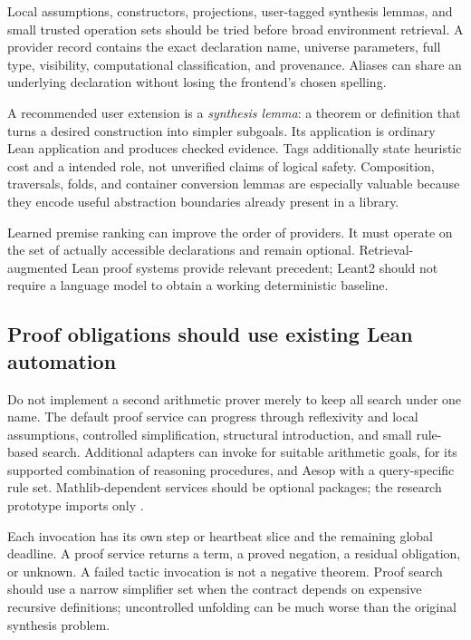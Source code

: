 \documentclass[11pt,letterpaper]{article}
\newcommand{\code}[1]{\texttt{\detokenize{#1}}}
\theoremstyle{definition}\newtheorem{definition}[theorem]{Definition}
\theoremstyle{remark}\newtheorem{remark}[theorem]{Remark}
\begin{document}
Local assumptions, constructors, projections, user-tagged synthesis lemmas, and
small trusted operation sets should be tried before broad environment retrieval.
A provider record contains the exact declaration name, universe parameters, full
type, visibility, computational classification, and provenance. Aliases can share
an underlying declaration without losing the frontend's chosen spelling.

A recommended user extension is a \emph{synthesis lemma}: a theorem or definition
that turns a desired construction into simpler subgoals. Its application is
ordinary Lean application and produces checked evidence. Tags additionally state
heuristic cost and a intended role, not unverified claims of logical safety.
Composition, traversals, folds, and container conversion lemmas are especially
valuable because they encode useful abstraction boundaries already present in
a library.

Learned premise ranking can improve the order of providers. It must operate on
the set of actually accessible declarations and remain optional. Retrieval-
augmented Lean proof systems provide relevant precedent; Leant2 should not
require a language model to obtain a working deterministic baseline.
\cite{leandojo}

\subsection{Proof obligations should use existing Lean automation}

Do not implement a second arithmetic prover merely to keep all search under one
name. The default proof service can progress through reflexivity and local
assumptions, controlled simplification, structural introduction, and small
rule-based search. Additional adapters can invoke \code{omega} for suitable
arithmetic goals, \code{grind} for its supported combination of reasoning
procedures, and Aesop with a query-specific rule set. Mathlib-dependent services
should be optional packages; the research prototype imports only \code{Lean}.
\cite{tactics,aesop}

Each invocation has its own step or heartbeat slice and the remaining global
deadline. A proof service returns a term, a proved negation, a residual obligation,
or unknown. A failed tactic invocation is not a negative theorem. Proof search
should use a narrow simplifier set when the contract depends on expensive
recursive definitions; uncontrolled unfolding can be much worse than the
original synthesis problem.
\end{document}
